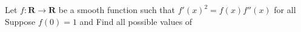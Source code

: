 Let $ f : \mathbf {R} \to \mathbf {R} $ be a smooth function such that $ f'(x)^2 = f(x) f''(x) $ for all  Suppose $f(0)=1$ and  Find all possible values of 